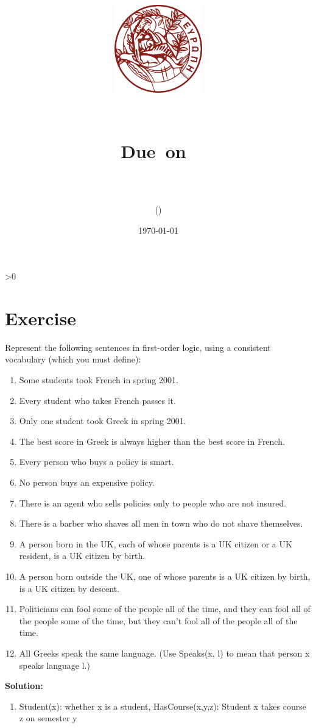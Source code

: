 \documentclass{article}
\title{
	\centering
	\includegraphics[height=1.5in]{images/background.png}
	
	 \vspace{1in}
	\textmd{\textbf{\hmwkClass\ \hmwkTitle}}\\
	
	\normalsize\vspace{0.1in}\small{Due\ on\ \hmwkDueDate}\\
	
	\vspace{0.1in}
	\large{\textit{\hmwkClassInstructor}} \\
	\vspace{0.5in}
	
	\large{\hmwkUniversity}

	\vspace{3in}
	
	\author{\textbf{\hmwkAuthorName} (\hmwkAuthorID)}
	\date{\today}
}
\newcounter{partCounter}
\newcounter{ExerciseCounter}
\newenvironment{Exercise}[1][-1]{
	\ifnum#1>0
	\setcounter{ExerciseCounter}{#1}
	\fi
	\section{Exercise \arabic{ExerciseCounter}}
	\setcounter{partCounter}{1}
}{
}
\newcommand{\solution}{\textbf{\large Solution:}}
\begin{document}
\maketitle
	
	



\begin{Exercise}[1]

Represent the following sentences in first-order logic, using a consistent vocabulary (which you must define):

\begin{enumerate}
\item Some students took French in spring 2001.
\item Every student who takes French passes it.
\item Only one student took Greek in spring 2001.
\item The best score in Greek is always higher than the best score in French.
\item Every person who buys a policy is smart.
\item No person buys an expensive policy.
\item There is an agent who sells policies only to people who are not insured.
\item There is a barber who shaves all men in town who do not shave themselves.
\item A person born in the UK, each of whose parents is a UK citizen or a UK resident, is a UK citizen by birth.
\item A person born outside the UK, one of whose parents is a UK citizen by birth, is a UK citizen by descent.
\item Politicians can fool some of the people all of the time, and they can fool all of the people some of the time, but they can’t fool all of the people all of the time.
\item All Greeks speak the same language. (Use Speaks(x, l) to mean that person x speaks language l.)

\end{enumerate}
	
\solution \\

\begin{enumerate}
	\item Student(x): whether x is a student, HasCourse(x,y,z): Student x takes course z on semester y \\
	

\end{enumerate}
\end{Exercise}
\end{document}
